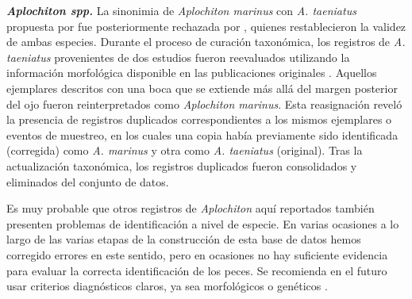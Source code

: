 \documentclass[sn-apa,pdflatex]{sn-jnl}
\newenvironment{Shaded}{\begin{snugshade}}{\end{snugshade}}
\newcommand{\CommentTok}[1]{\textcolor[rgb]{0.56,0.35,0.01}{\textit{#1}}}
\newcommand{\FunctionTok}[1]{\textcolor[rgb]{0.13,0.29,0.53}{\textbf{#1}}}
\newcommand{\NormalTok}[1]{#1}
\newcommand{\OtherTok}[1]{\textcolor[rgb]{0.56,0.35,0.01}{#1}}
\newcommand{\SpecialCharTok}[1]{\textcolor[rgb]{0.81,0.36,0.00}{\textbf{#1}}}
\begin{document}
\begin{Shaded}
\end{Shaded}

\textbf{\emph{Aplochiton spp.}} La sinonimia de \emph{Aplochiton
marinus} con \emph{A. taeniatus} propuesta por
\citet{mcdowallMorphologicalDivergenceTwo1988} fue posteriormente
rechazada por \citet{Alo2013}, quienes restablecieron la validez de
ambas especies. Durante el proceso de curación taxonómica, los registros
de \emph{A. taeniatus} provenientes de dos estudios fueron reevaluados
utilizando la información morfológica disponible en las publicaciones
originales
\citep[\citet{mcdowallMorphologicalDivergenceTwo1988}]{mcdowallIdentityGalaxioidFishes1987}.
Aquellos ejemplares descritos con una boca que se extiende más allá del
margen posterior del ojo fueron reinterpretados como \emph{Aplochiton
marinus}. Esta reasignación reveló la presencia de registros duplicados
correspondientes a los mismos ejemplares o eventos de muestreo, en los
cuales una copia había previamente sido identificada (corregida) como
\emph{A. marinus} y otra como \emph{A. taeniatus} (original). Tras la
actualización taxonómica, los registros duplicados fueron consolidados y
eliminados del conjunto de datos.

Es muy probable que otros registros de \emph{Aplochiton} aquí reportados
también presenten problemas de identificación a nivel de especie. En
varias ocasiones a lo largo de las varias etapas de la construcción de
esta base de datos hemos corregido errores en este sentido, pero en
ocasiones no hay suficiente evidencia para evaluar la correcta
identificación de los peces. Se recomienda en el futuro usar criterios
diagnósticos claros, ya sea morfológicos o genéticos
\citep[\citet{Correa-Boisjoly2026}]{Alo2013}.
\end{document}
